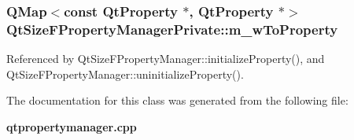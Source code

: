 \subsubsection[{m\+\_\+w\+To\+Property}]{\setlength{\rightskip}{0pt plus 5cm}Q\+Map$<$const {\bf Qt\+Property} $\ast$, {\bf Qt\+Property} $\ast$$>$ Qt\+Size\+F\+Property\+Manager\+Private\+::m\+\_\+w\+To\+Property}\label{classQtSizeFPropertyManagerPrivate_aaa0a681e9856d4fcaeb8b9264bf42b03}


Referenced by Qt\+Size\+F\+Property\+Manager\+::initialize\+Property(), and Qt\+Size\+F\+Property\+Manager\+::uninitialize\+Property().



The documentation for this class was generated from the following file\+:\begin{DoxyCompactItemize}
\item 
{\bf qtpropertymanager.\+cpp}\end{DoxyCompactItemize}
